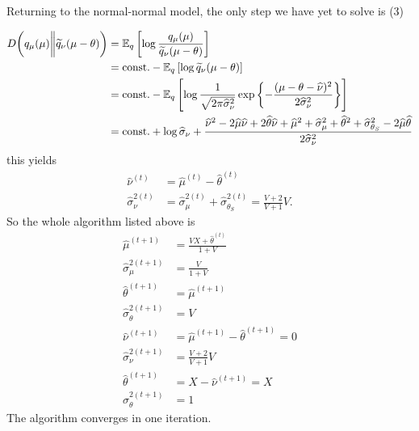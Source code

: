 \documentclass{article}
\begin{document}
 Returning to the normal-normal model, the only step we have yet to solve is (3)

\begin{align}
D\bigg(q_\mu(\mu)\bigg\|\widetilde q_\nu(\mu-\theta)\bigg)
&= \EE_q\left[\log \frac{q_\mu(\mu)}{\widetilde q_\nu(\mu-\theta)}\right] \\
&= \text{const.} - \EE_q\left[\log\widetilde q_\nu(\mu-\theta)\right] \\
&= \text{const.}%
 - \EE_q\left[\log\frac{1}{\sqrt{2\pi\widehat\sigma_\nu^2}}\exp\left\{-\frac{(\mu-\theta-\widehat\nu)^2}{2\widehat\sigma_\nu^2}\right\}\right] \\
 &= \text{const.}
 +\log\widehat\sigma_\nu
 + \frac{\widehat\nu^2 - 2\widehat\mu\widehat\nu+2\widehat\theta\widehat\nu
+\widehat\mu^2+\widehat\sigma^2_\mu+\widehat\theta^2+\widehat\sigma^2_{\theta_S}-2\widehat\mu\widehat\theta
 }{2\widehat\sigma_\nu^2}%
\end{align}
this yields 
\begin{align}
\widehat\nu^{(t)} 
&=\widehat\mu^{(t)}-\widehat\theta^{(t)} \\
\widehat\sigma_\nu^{2(t)}
&= \widehat\sigma^{2(t)}_\mu+\widehat\sigma^{2(t)}_{\theta_S}
=\frac{V+2}{V+1}V.
\end{align}
So the whole algorithm listed above is
\begin{align}
\widehat\mu^{(t+1)}
&= \frac{VX + \widehat\theta^{(t)}}{1+V} \\
\widehat\sigma^{2(t+1)}_{\mu}
&= \frac{V}{1+V} \\
\widehat\theta^{(t+1)}
&= \widehat\mu^{(t+1)} \\
\widehat\sigma^{2(t+1)}_{\theta}
&= V \\
\widehat\nu^{(t+1)}
&=  \widehat\mu^{(t+1)} - \widehat\theta^{(t+1)} = 0 \\
\widehat\sigma_\nu^{2(t+1)}
&=\frac{V+2}{V+1}V \\
\widehat\theta^{(t+1)}
&= X-\widehat\nu^{(t+1)} = X\\
\sigma_{\theta}^{2(t+1)}
&= 1
\end{align}
The algorithm converges in one iteration.
 
\end{document}
